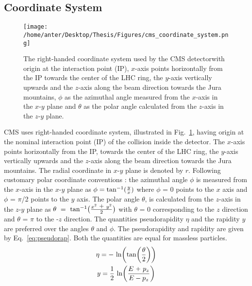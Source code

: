 \subsection{Coordinate System}
\begin{figure}[!h]
\begin{center} 
\hspace*{-15mm}
\texttt{[image: /home/anter/Desktop/Thesis/Figures/cms\_coordinate\_system.png]}
\vspace{3mm}
\caption[Co-ordinate]{The right-handed coordinate system used by the CMS detector\footnotemark with origin at the interaction point (IP), $x$-axis points horizontally from the IP towards the center of the LHC ring, the $y$-axis vertically upwards and the $z$-axis along the beam direction towards the Jura mountains, $\phi$ as the azimuthal angle measured from the $x$-axis in the $x$-$y$ plane and $\theta$ as the polar angle calculated from the $z$-axis in the $z$-$y$ plane.}
\label{fig:coordinate}
\end{center}
\end{figure}
CMS uses right-handed coordinate system, illustrated in Fig.~\ref{fig:coordinate}, having origin at the nominal interaction point (IP) of the collision inside the detector. The $x$-axis points horizontally from the IP, towards the center of the LHC ring, the $y$-axis vertically upwards and the $z$-axis along the beam direction towards the Jura mountains. The radial coordinate in $x$-$y$ plane is denoted by $r$. Following customary polar coordinate conventions : the azimuthal angle $\phi$ is measured from the $x$-axis in the $x$-$y$ plane as $\phi = {\rm tan^{-1}}(\frac{y}{x})$ where $\phi$ = 0 points to the \plusn $x$ axis and $\phi$ = $\pi$/2 points to the \plusn $y$ axis. The polar angle $\theta$, is calculated from the $z$-axis in the $z$-$y$ plane as $\theta~=~{\rm tan^{-1}}\big(\frac{x^2~\plus y^2}{2}\big)$ with $\theta$ = 0 corresponding to the \plusn $z$ direction and $\theta$ = $\pi$ to the -$z$ direction. The quantities pseudorapidity $\eta$ and the rapidity $y$ are preferred over the angles $\theta$ and $\phi$. The pseudorapidity and rapidity are given by Eq.~\ref{eq:pseudorap}. Both the quantities are equal for massless particles.
\begin{equation}
\begin{gathered}
\eta = -~{\rm ln}\bigg({\rm tan}\bigg(\frac{\theta}{2}\bigg)\bigg)\\
y = \frac{1}{2}~{\rm ln} \bigg(\frac{E~\plus p_z}{E - p_z} \bigg)
\end{gathered}
\label{eq:pseudorap}
\end{equation}
